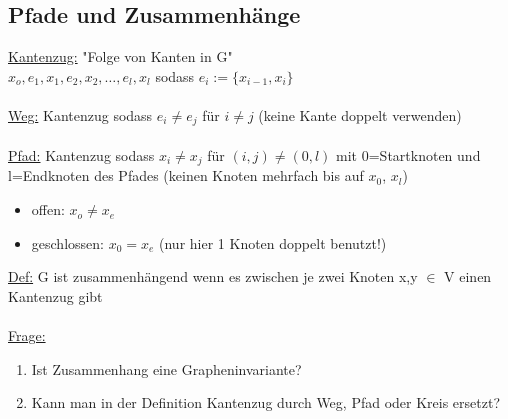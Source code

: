 \subsection{Pfade und Zusammenhänge}

\underline{Kantenzug:} "Folge von Kanten in G"\\
$x_o,e_1,x_1,e_2,x_2,…,e_l,x_l$ sodass $e_i:=\{x_{i-1},x_i\}$\\\\
\underline{Weg:} Kantenzug sodass $e_i \neq e_j$ für $i \neq j$ (keine Kante doppelt verwenden)\\\\
\underline{Pfad:} Kantenzug sodass $x_i \neq x_j$ für $(i,j) \neq (0,l)$ mit 0=Startknoten und l=Endknoten des Pfades (keinen Knoten mehrfach bis auf $x_0$, $x_l$)

\begin{itemize}
	\item offen: $x_o \neq x_e$
	\item geschlossen: $x_0=x_e$ (nur hier 1 Knoten doppelt benutzt!)
\end{itemize}

\underline{Def:} G ist zusammenhängend wenn es zwischen je zwei Knoten x,y $\in$ V einen Kantenzug gibt
\\\\
\underline{Frage:}
\begin{enumerate}
	\item Ist Zusammenhang eine Grapheninvariante?
	\item Kann man in der Definition Kantenzug durch Weg, Pfad oder Kreis ersetzt?
\end{enumerate}